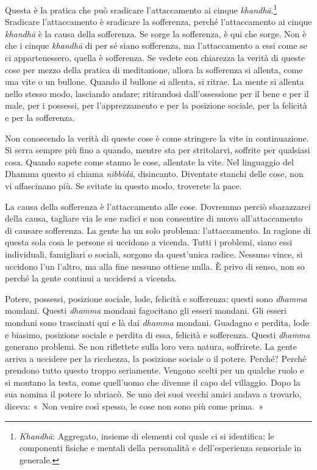 Questa è la pratica che può sradicare l'attaccamento ai cinque
\emph{khandhā}.\footnote{\emph{Khandhā}: Aggregato, insieme di elementi
  col quale ci si identifica; le componenti fisiche e mentali della
  personalità e dell'esperienza sensoriale in generale.} Sradicare
l'attaccamento è sradicare la sofferenza, perché l'attaccamento ai
cinque \emph{khandhā} è la causa della sofferenza. Se sorge la
sofferenza, è qui che sorge. Non è che i cinque \emph{khandhā} di per sé
siano sofferenza, ma l'attaccamento a essi come se ci appartenessero,
quella è sofferenza. Se vedete con chiarezza la verità di queste cose
per mezzo della pratica di meditazione, allora la sofferenza si allenta,
come una vite o un bullone. Quando il bullone si allenta, si ritrae. La
mente si allenta nello stesso modo, lasciando andare; ritirandosi
dall'ossessione per il bene e per il male, per i possessi, per
l'apprezzamento e per la posizione sociale, per la felicità e per la
sofferenza.

Non conoscendo la verità di queste cose è come stringere la vite in
continuazione. Si serra sempre più fino a quando, mentre sta per
stritolarvi, soffrite per qualsiasi cosa. Quando sapete come stanno le
cose, allentate la vite. Nel linguaggio del Dhamma questo si chiama
\emph{nibbidā}, disincanto. Diventate stanchi delle cose, non vi
affascinano più. Se svitate in questo modo, troverete la pace.

La causa della sofferenza è l'attaccamento alle cose. Dovremmo perciò
sbarazzarci della causa, tagliare via le sue radici e non consentire di
nuovo all'attaccamento di causare sofferenza. La gente ha un solo
problema: l'attaccamento. In ragione di questa sola cosa le persone si
uccidono a vicenda. Tutti i problemi, siano essi individuali, famigliari
o sociali, sorgono da quest'unica radice. Nessuno vince, si uccidono
l'un l'altro, ma alla fine nessuno ottiene nulla. È privo di senso, non
so perché la gente continui a uccidersi a vicenda.

Potere, possessi, posizione sociale, lode, felicità e sofferenza: questi
sono \emph{dhamma} mondani. Questi \emph{dhamma} mondani fagocitano gli
esseri mondani. Gli esseri mondani sono trascinati qui e là dai
\emph{dhamma} mondani. Guadagno e perdita, lode e biasimo, posizione
sociale e perdita di essa, felicità e sofferenza. Questi \emph{dhamma}
generano problemi. Se non riflettete sulla loro vera natura, soffrirete.
La gente arriva a uccidere per la ricchezza, la posizione sociale o il
potere. Perché? Perché prendono tutto questo troppo seriamente. Vengono
scelti per un qualche ruolo e si montano la testa, come quell'uomo che
divenne il capo del villaggio. Dopo la sua nomina il potere lo ubriacò.
Se uno dei suoi vecchi amici andava a trovarlo, diceva: «~Non venire
così spesso, le cose non sono più come prima.~»

